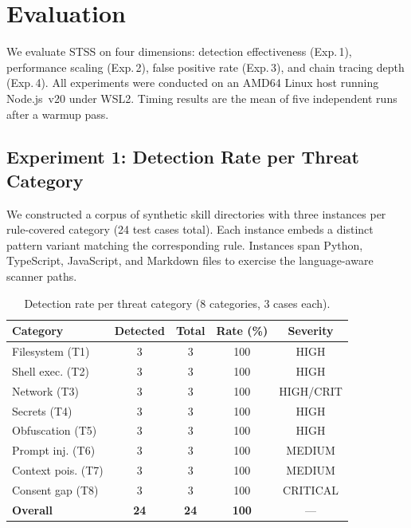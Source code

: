 \documentclass[11pt,twocolumn]{article}
\begin{document}
\section{Evaluation}
\label{sec:eval}

We evaluate STSS on four dimensions: detection effectiveness (Exp.\,1),
performance scaling (Exp.\,2), false positive rate (Exp.\,3), and chain
tracing depth (Exp.\,4). All experiments were conducted on an AMD64 Linux
host running Node.js~v20 under WSL2. Timing results are the mean of five
independent runs after a warmup pass.

\subsection{Experiment 1: Detection Rate per Threat Category}

We constructed a corpus of synthetic skill directories with three instances
per rule-covered category (24 test cases total). Each instance embeds a
distinct pattern variant matching the corresponding rule. Instances span
Python, TypeScript, JavaScript, and Markdown files to exercise the
language-aware scanner paths.

\begin{table}[h]
\centering
\caption{Detection rate per threat category (8 categories, 3 cases each).}
\label{tab:detection}
\renewcommand{\arraystretch}{1.1}
\scriptsize
\begin{tabular}{lcccc}
\toprule
\textbf{Category} & \textbf{Detected} & \textbf{Total} & \textbf{Rate (\%)} & \textbf{Severity} \\
\midrule
Filesystem (T1)     & 3 & 3 & 100 & HIGH \\
Shell exec. (T2)    & 3 & 3 & 100 & HIGH \\
Network (T3)        & 3 & 3 & 100 & HIGH/CRIT \\
Secrets (T4)        & 3 & 3 & 100 & HIGH \\
Obfuscation (T5)    & 3 & 3 & 100 & HIGH \\
Prompt inj. (T6)    & 3 & 3 & 100 & MEDIUM \\
Context pois. (T7)  & 3 & 3 & 100 & MEDIUM \\
Consent gap (T8)    & 3 & 3 & 100 & CRITICAL \\
\midrule
\textbf{Overall}    & \textbf{24} & \textbf{24} & \textbf{100} & — \\
\bottomrule
\end{tabular}
\end{table}
\end{document}
